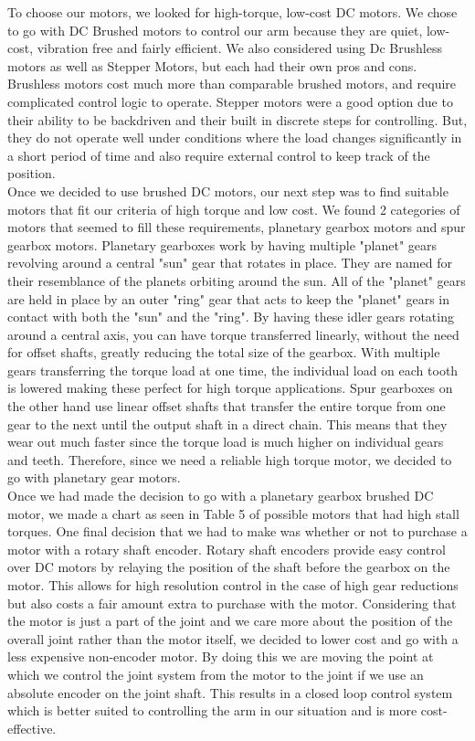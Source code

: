 To choose our motors, we looked for high-torque, low-cost DC motors. We chose to go with DC Brushed motors to control our arm because they are quiet, low-cost, vibration free and fairly efficient. We also considered using Dc Brushless motors as well as Stepper Motors, but each had their own pros and cons. Brushless motors cost much more than comparable brushed motors, and require complicated control logic to operate. Stepper motors were a good option due to their ability to be backdriven and their built in discrete steps for controlling. But, they do not operate well under conditions where the load changes significantly in a short period of time and also require external control to keep track of the position.  \\
\newline
Once we decided to use brushed DC motors, our next step was to find suitable motors that fit our criteria of high torque and low cost. We found 2 categories of motors that seemed to fill these requirements, planetary gearbox motors and spur gearbox motors. Planetary gearboxes work by having multiple "planet" gears revolving around a central "sun" gear that rotates in place. They are named for their resemblance of the planets orbiting around the sun. All of the "planet" gears are held in place by an outer "ring" gear that acts to keep the "planet" gears in contact with both the "sun" and the "ring". By having these idler gears rotating around a central axis, you can have torque transferred linearly, without the need for offset shafts, greatly reducing the total size of the gearbox. With multiple gears transferring the torque load at one time, the individual load on each tooth is lowered making these perfect for high torque applications. Spur gearboxes on the other hand use linear offset shafts that transfer the entire torque from one gear to the next until the output shaft in a direct chain.  This means that they wear out much faster since the torque load is much higher on individual gears and teeth.  Therefore, since we need a reliable high torque motor, we decided to go with planetary gear motors.  \\
\newline
Once we had made the decision to go with a planetary gearbox brushed DC motor, we made a chart as seen in Table 5 of possible motors that had high stall torques.  One final decision that we had to make was whether or not to purchase a motor with a rotary shaft encoder. Rotary shaft encoders provide easy control over DC motors by relaying the position of the shaft before the gearbox on the motor.  This allows for high resolution control in the case of high gear reductions but also costs a fair amount extra to purchase with the motor.  Considering that the motor is just a part of the joint and we care more about the position of the overall joint rather than the motor itself, we decided to lower cost and go with a less expensive non-encoder motor.  By doing this we are moving the point at which we control the joint system from the motor to the joint if we use an absolute encoder on the joint shaft.  This results in a closed loop control system which is better suited to controlling the arm in our situation and is more cost-effective.  

